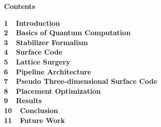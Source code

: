 \documentclass[a4paper,11pt]{ltjsarticle}
\begin{document}
\huge\bfseries{Contents}

\vspace{10pt}
\Large\bfseries{
1\ \ Introduction\\
2\ \ Basics of Quantum Computation\\
3\ \ Stabilizer Formalism\\
4\ \ Surface Code\\
5\ \ Lattice Surgery\\
6\ \ Pipeline Architecture\\
7\ \ Pseudo Three-dimensional Surface Code\\
8\ \ Placement Optimization\\
9\ \ Results\\
10\ \ Conclusion\\
11\ \ Future Work\\
}
\end{document}
